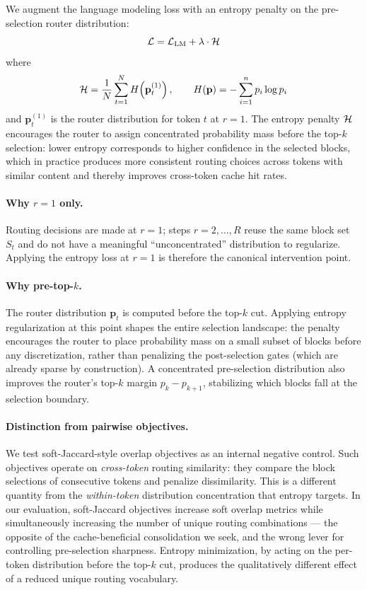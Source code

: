 We augment the language modeling loss with an entropy penalty on the pre-selection router
distribution:
\begin{equation}
  \mathcal{L} = \mathcal{L}_{\mathrm{LM}} + \lambda \cdot \mathcal{H}
  \label{eq:loss}
\end{equation}
where
\begin{equation}
  \mathcal{H} = \frac{1}{N} \sum_{t=1}^{N} H\!\left(\mathbf{p}_t^{(1)}\right),
  \qquad
  H(\mathbf{p}) = -\sum_{i=1}^{n} p_i \log p_i
  \label{eq:entropy}
\end{equation}
and $\mathbf{p}_t^{(1)}$ is the router distribution for token $t$ at $r = 1$.
The entropy penalty $\mathcal{H}$ encourages the router to assign concentrated probability mass
before the top-$k$ selection: lower entropy corresponds to higher confidence in the selected
blocks, which in practice produces more consistent routing choices across tokens with similar
content and thereby improves cross-token cache hit rates.

\paragraph{Why $r = 1$ only.}
Routing decisions are made at $r = 1$; steps $r = 2, \ldots, R$ reuse the same block set
$S_t$ and do not have a meaningful ``unconcentrated'' distribution to regularize.
Applying the entropy loss at $r = 1$ is therefore the canonical intervention point.

\paragraph{Why pre-top-$k$.}
The router distribution $\mathbf{p}_t$ is computed before the top-$k$ cut.
Applying entropy regularization at this point shapes the entire selection landscape: the
penalty encourages the router to place probability mass on a small subset of blocks before
any discretization, rather than penalizing the post-selection gates (which are already
sparse by construction).
A concentrated pre-selection distribution also improves the router's top-$k$ margin
$p_k - p_{k+1}$, stabilizing which blocks fall at the selection boundary.

\paragraph{Distinction from pairwise objectives.}
We test soft-Jaccard-style overlap objectives as an internal negative control.
Such objectives operate on \emph{cross-token} routing similarity: they compare the block
selections of consecutive tokens and penalize dissimilarity.
This is a different quantity from the \emph{within-token} distribution concentration that
entropy targets.
In our evaluation, soft-Jaccard objectives increase soft overlap metrics while
simultaneously increasing the number of unique routing combinations --- the opposite of the
cache-beneficial consolidation we seek, and the wrong lever for controlling pre-selection
sharpness.
Entropy minimization, by acting on the per-token distribution before the top-$k$ cut,
produces the qualitatively different effect of a reduced unique routing vocabulary.

